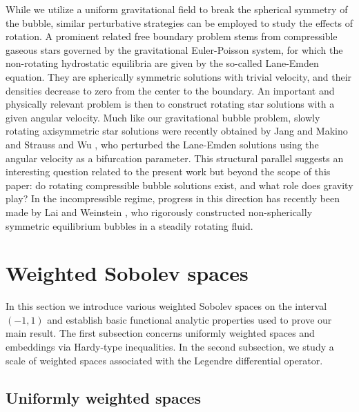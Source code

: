 \documentclass[11pt,reqno]{amsart}
\numberwithin{equation}{section}
\begin{document}
While we utilize a uniform gravitational field to break the spherical symmetry of the bubble, similar perturbative strategies can be employed to study the effects of rotation. A prominent related free boundary problem stems from compressible gaseous stars governed by the gravitational Euler-Poisson system, for which the non-rotating hydrostatic equilibria are given by the so-called Lane-Emden equation. They are spherically symmetric solutions with trivial velocity, and their densities decrease to zero from the center to the boundary. An important and physically relevant problem is then to construct rotating star solutions with a given angular velocity. Much like our gravitational bubble problem, slowly rotating axisymmetric star solutions were recently obtained by Jang and Makino \cite{JM_2017, JM_2019} and Strauss and Wu \cite{SW_2017}, who perturbed the Lane-Emden solutions using the angular velocity as a bifurcation parameter. This structural parallel suggests an interesting question related to the present work but beyond the scope of this paper: do rotating compressible bubble solutions exist, and what role does gravity play?  In the incompressible regime, progress in this direction has recently been made by Lai and Weinstein \cite{LaiW_2025_2}, who rigorously constructed non-spherically symmetric equilibrium bubbles in a steadily rotating fluid.



\section{Weighted Sobolev spaces}


In this section we introduce various weighted Sobolev spaces on the interval $(-1,1)$ and establish basic functional analytic properties used to prove our main result.  The first subsection concerns uniformly weighted spaces and embeddings via Hardy-type inequalities. In the second subsection, we study a scale of weighted spaces associated with the Legendre differential operator. 


\subsection{Uniformly weighted spaces}
\end{document}

